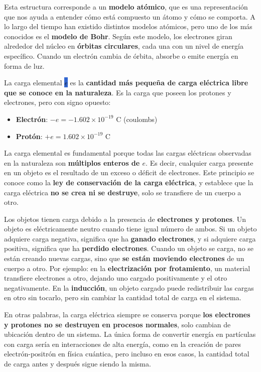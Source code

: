 Esta estructura corresponde a un \textbf{modelo atómico}, que es una representación que nos ayuda a entender cómo está compuesto un átomo y cómo se comporta. A lo largo del tiempo han existido distintos modelos atómicos, pero uno de los más conocidos es el \textbf{modelo de Bohr}. Según este modelo, los electrones giran alrededor del núcleo en \textbf{órbitas circulares}, cada una con un nivel de energía específico. Cuando un electrón cambia de órbita, absorbe o emite energía en forma de luz.

La carga elemental \colorbox{highlight}{\( e \)} es la \textbf{cantidad más pequeña de carga eléctrica libre que se conoce en la naturaleza}. Es la carga que poseen los protones y electrones, pero con signo opuesto:

\begin{itemize}
    \item \textbf{Electrón}: \( -e = -1.602 \times 10^{-19} \) C (coulombs)
    \item \textbf{Protón}: \( +e = 1.602 \times 10^{-19} \) C
\end{itemize}

La carga elemental es fundamental porque todas las cargas eléctricas observadas en la naturaleza son \textbf{múltiplos enteros de \( e \)}. Es decir, cualquier carga presente en un objeto es el resultado de un exceso o déficit de electrones. Este principio se conoce como la \textbf{ley de conservación de la carga eléctrica}, y establece que la carga eléctrica \textbf{no se crea ni se destruye}, solo se transfiere de un cuerpo a otro.  

Los objetos tienen carga debido a la presencia de \textbf{electrones y protones}. Un objeto es eléctricamente neutro cuando tiene igual número de ambos. Si un objeto adquiere carga negativa, significa que ha \textbf{ganado electrones}, y si adquiere carga positiva, significa que ha \textbf{perdido electrones}. Cuando un objeto se carga, no se están creando nuevas cargas, sino que \textbf{se están moviendo electrones} de un cuerpo a otro. Por ejemplo: en la \textbf{electrización por frotamiento}, un material transfiere electrones a otro, dejando uno cargado positivamente y el otro negativamente. En la \textbf{inducción}, un objeto cargado puede redistribuir las cargas en otro sin tocarlo, pero sin cambiar la cantidad total de carga en el sistema.

En otras palabras, la carga eléctrica siempre se conserva porque \textbf{los electrones y protones no se destruyen en procesos normales}, solo cambian de ubicación dentro de un sistema. La única forma de convertir energía en partículas con carga sería en interacciones de alta energía, como en la creación de pares electrón-positrón en física cuántica, pero incluso en esos casos, la cantidad total de carga antes y después sigue siendo la misma.  

